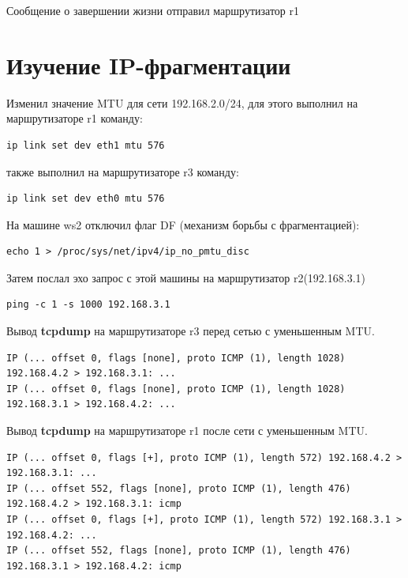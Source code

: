 \documentclass[a4paper,12pt]{article}
\begin{document}
Сообщение о завершении жизни отправил маршрутизатор r1
\section{Изучение IP-фрагментации}

Изменил значение MTU для сети 192.168.2.0/24, для этого выполнил на маршрутизаторе r1 команду:
\begin{Verbatim}
ip link set dev eth1 mtu 576
\end{Verbatim}
также выполнил на маршрутизаторе r3 команду: 
\begin{Verbatim}
ip link set dev eth0 mtu 576
\end{Verbatim}


На машине ws2 отключил флаг DF (механизм борьбы с фрагментацией):
\begin{Verbatim}
echo 1 > /proc/sys/net/ipv4/ip_no_pmtu_disc
\end{Verbatim}
Затем послал эхо запрос с этой машины на маршрутизатор r2(192.168.3.1)
\begin{Verbatim}
ping -c 1 -s 1000 192.168.3.1
\end{Verbatim}


Вывод \textbf{tcpdump} на маршрутизаторе r3 перед сетью с уменьшенным MTU.


\begin{Verbatim}
IP (... offset 0, flags [none], proto ICMP (1), length 1028) 192.168.4.2 > 192.168.3.1: ...
IP (... offset 0, flags [none], proto ICMP (1), length 1028) 192.168.3.1 > 192.168.4.2: ...
\end{Verbatim}

Вывод \textbf{tcpdump} на маршрутизаторе r1 после сети с уменьшенным MTU.


\begin{Verbatim}
IP (... offset 0, flags [+], proto ICMP (1), length 572) 192.168.4.2 > 192.168.3.1: ...
IP (... offset 552, flags [none], proto ICMP (1), length 476) 192.168.4.2 > 192.168.3.1: icmp
IP (... offset 0, flags [+], proto ICMP (1), length 572) 192.168.3.1 > 192.168.4.2: ...
IP (... offset 552, flags [none], proto ICMP (1), length 476) 192.168.3.1 > 192.168.4.2: icmp
\end{Verbatim}
\end{document}
